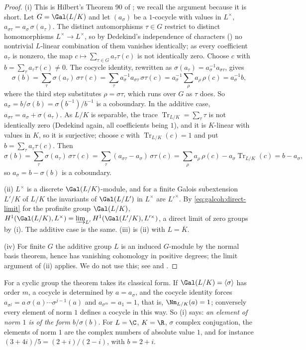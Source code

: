 \begin{proof}
(i) This is Hilbert's Theorem 90 of ; we recall the argument because it is short. Let $G=\Gal(L/K)$ and let $(a_\sigma)$ be a $1$-cocycle with
values in $L^\times$, $a_{\sigma\tau}=a_\sigma\,\sigma(a_\tau)$. The distinct automorphisms $\tau\in G$ restrict to distinct homomorphisms $L^\times\to L^\times$, so by
Dedekind's independence of characters () no nontrivial $L$-linear combination of them vanishes identically; as every coefficient $a_\tau$ is nonzero,
the map $c\mapsto\sum_{\tau\in G}a_\tau\tau(c)$ is not identically zero. Choose $c$ with $b=\sum_\tau a_\tau\tau(c)\ne0$. The cocycle identity, rewritten as
$\sigma(a_\tau)=a_\sigma^{-1}a_{\sigma\tau}$, gives
\[
\sigma(b)=\sum_\tau\sigma(a_\tau)\,\sigma\tau(c)=\sum_\tau a_\sigma^{-1}a_{\sigma\tau}\,\sigma\tau(c)=a_\sigma^{-1}\sum_\rho a_\rho\,\rho(c)=a_\sigma^{-1}b,
\]
where the third step substitutes $\rho=\sigma\tau$, which runs over $G$ as $\tau$ does. So $a_\sigma=b/\sigma(b)=\sigma(b^{-1})/b^{-1}$ is a coboundary. In the additive case,
$a_{\sigma\tau}=a_\sigma+\sigma(a_\tau)$. As $L/K$ is separable, the trace $\operatorname{Tr}_{L/K}=\sum_\tau\tau$ is not identically zero (Dedekind again, all coefficients being $1$), and
it is $K$-linear with values in $K$, so it is surjective; choose $c$ with $\operatorname{Tr}_{L/K}(c)=1$ and put $b=\sum_\tau a_\tau\tau(c)$. Then
\[
\sigma(b)=\sum_\tau\sigma(a_\tau)\,\sigma\tau(c)=\sum_\tau(a_{\sigma\tau}-a_\sigma)\,\sigma\tau(c)=\sum_\rho a_\rho\,\rho(c)-a_\sigma\operatorname{Tr}_{L/K}(c)=b-a_\sigma,
\]
so $a_\sigma=b-\sigma(b)$ is a coboundary.

(ii) $L^\times$ is a discrete $\Gal(L/K)$-module, and for a finite Galois subextension $L'/K$ of $L/K$ the invariants of $\Gal(L/L')$ in $L^\times$ are $L'^\times$. By
\eqref{eq:galcoh:direct-limit} for the profinite group $\Gal(L/K)$, $H^1(\Gal(L/K),L^\times)=\varinjlim_{L'}H^1(\Gal(L'/K),L'^\times)$, a direct limit of zero groups by
(i). The additive case is the same. (iii) is (ii) with $L=\overline K$.

(iv) For finite $G$ the additive group $L$ is an induced $G$-module by the normal basis theorem, hence has vanishing cohomology in positive degrees;
the limit argument of (ii) applies. We do not use this; see \cite[Chapter X, Section 1]{SerreLocalFields} and \cite[Chapter II, Section 1]{SerreGaloisCoh}.
\end{proof}

\noindent For a cyclic group the theorem takes its classical form. If $\Gal(L/K)=\langle\sigma\rangle$ has order $m$, a cocycle is determined by $a=a_\sigma$, and the cocycle
identity forces $a_{\sigma^j}=a\,\sigma(a)\cdots\sigma^{j-1}(a)$ and $a_{\sigma^m}=a_1=1$, that is, $\Nm_{L/K}(a)=1$; conversely every element of norm $1$ defines a cocycle in this
way. So (i) says: \emph{an element of norm $1$ is of the form $b/\sigma(b)$}. For $L=\C$, $K=\R$, $\sigma$ complex conjugation, the elements of norm $1$ are the complex
numbers of absolute value $1$, and for instance $(3+4i)/5=(2+i)/(2-i)$, with $b=2+i$.

